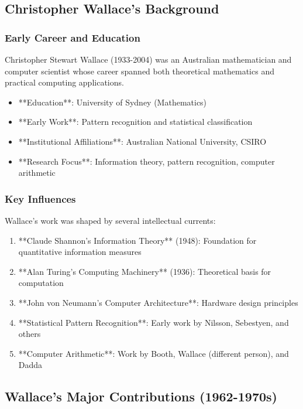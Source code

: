\subsection{Christopher Wallace's Background}

\subsubsection{Early Career and Education}

Christopher Stewart Wallace (1933-2004) was an Australian mathematician and computer scientist whose career spanned both theoretical mathematics and practical computing applications.

\begin{itemize}
    \item **Education**: University of Sydney (Mathematics)
    \item **Early Work**: Pattern recognition and statistical classification
    \item **Institutional Affiliations**: Australian National University, CSIRO
    \item **Research Focus**: Information theory, pattern recognition, computer arithmetic
\end{itemize}

\subsubsection{Key Influences}

Wallace's work was shaped by several intellectual currents:

\begin{enumerate}
    \item **Claude Shannon's Information Theory** (1948): Foundation for quantitative information measures
    \item **Alan Turing's Computing Machinery** (1936): Theoretical basis for computation
    \item **John von Neumann's Computer Architecture**: Hardware design principles
    \item **Statistical Pattern Recognition**: Early work by Nilsson, Sebestyen, and others
    \item **Computer Arithmetic**: Work by Booth, Wallace (different person), and Dadda
\end{enumerate}

\subsection{Wallace's Major Contributions (1962-1970s)}

